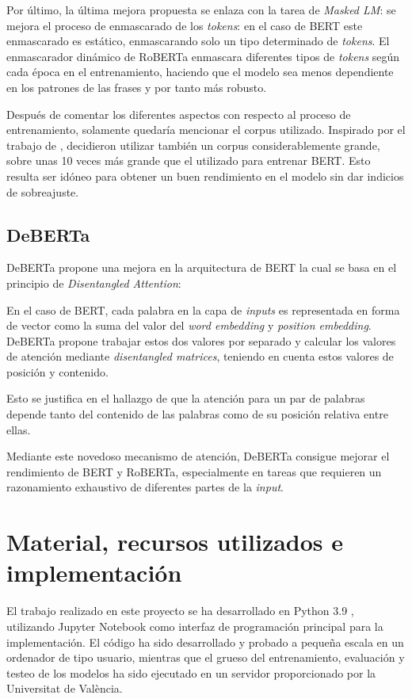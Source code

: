 Por último, la última mejora propuesta se enlaza con la tarea de \emph{Masked LM}: se mejora el proceso de enmascarado de los \emph{tokens}: en el caso de BERT este enmascarado es estático, enmascarando solo un tipo determinado de \emph{tokens}. El enmascarador dinámico de RoBERTa enmascara diferentes tipos de \emph{tokens} según cada época en el entrenamiento, haciendo que el modelo sea menos dependiente en los patrones de las frases y por tanto más robusto.

Después de comentar los diferentes aspectos con respecto al proceso de entrenamiento, solamente quedaría mencionar el corpus utilizado. Inspirado por el trabajo de \citet{Yang2019}, decidieron utilizar también un corpus considerablemente grande, sobre unas 10 veces más grande que el utilizado para entrenar BERT. Esto resulta ser idóneo para obtener un buen rendimiento en el modelo sin dar indicios de sobreajuste.

\subsection{DeBERTa}

DeBERTa \citep{He2020} propone una mejora en la arquitectura de BERT \citep{Devlin2018} la cual se basa en el principio de \emph{Disentangled Attention}:

En el caso de BERT, cada palabra en la capa de \emph{inputs} es representada en forma de vector como la suma del valor del \emph{word embedding} y \emph{position embedding}. DeBERTa propone trabajar estos dos valores por separado y calcular los valores de atención mediante \emph{disentangled matrices}, teniendo en cuenta estos valores de posición y contenido.

Esto se justifica en el hallazgo de que la atención para un par de palabras depende tanto del contenido de las palabras como de su posición relativa entre ellas.

Mediante este novedoso mecanismo de atención, DeBERTa consigue mejorar el rendimiento de BERT y RoBERTa, especialmente en tareas que requieren un razonamiento exhaustivo de diferentes partes de la \emph{input}.


\section{Material, recursos utilizados e implementación}

El trabajo realizado en este proyecto se ha desarrollado en Python 3.9 \citep{python}, utilizando Jupyter Notebook \citep{jupyter} como interfaz de programación principal para la implementación. El código ha sido desarrollado y probado a pequeña escala en un ordenador de tipo usuario, mientras que el grueso del entrenamiento, evaluación y testeo de los modelos ha sido ejecutado en un servidor proporcionado por la Universitat de València.

